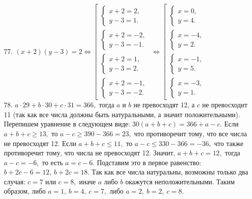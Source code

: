 77. $(x+2)(y-3)=2\Leftrightarrow \left[\begin{array}{l}\begin{cases}x+2=2,\\ y-3=1.\end{cases}\\ \begin{cases}x+2=-2,\\ y-3=-1.\end{cases}\\
\begin{cases}x+2=1,\\ y-3=2.\end{cases}\\ \begin{cases}x+2=-1,\\ y-3=-2.\end{cases}\end{array}\right.\Leftrightarrow
\left[\begin{array}{l}\begin{cases}x=0,\\ y=4.\end{cases}\\ \begin{cases} x=-4,\\ y=2.\end{cases}\\
\begin{cases}x=-1,\\ y=5.\end{cases}\\ \begin{cases}x=-3,\\ y=1.\end{cases}\end{array}\right.$\\
78. $a\cdot29+b\cdot30+c\cdot31=366,$ тогда $a$ и $b$ не превосходят 12, а $c$ не превосходит 11 (так как все числа должны быть натуральными, а значит положительными). Перепишем уравнение в следующем виде: $30(a+b+c)=366+a-c.$ Если $a+b+c\geqslant 13,$ то $a-c\geqslant390-366=23,$ что противоречит тому, что все числа не превосходят 12. Если $a+b+c\leqslant 11,$ то $a-c\leqslant 330-366=-36,$ что также противоречит тому, что числа не превосходят 12. Значит, $a+b+c=12,$ тогда $a-c=-6,$ то есть $a=c-6.$ Подставим это в первое равенство: $b+2c-6=12,\ b+2c=18.$ Так как все числа натуральны, возможны только два случая: $c=7$ или $c=8,$ иначе $a$ либо $b$ окажутся неположительными. Таким образом, либо $a=1,\ b=4,\ c=7,$ либо $a=2,\ b=2,\ c=8.$\\
